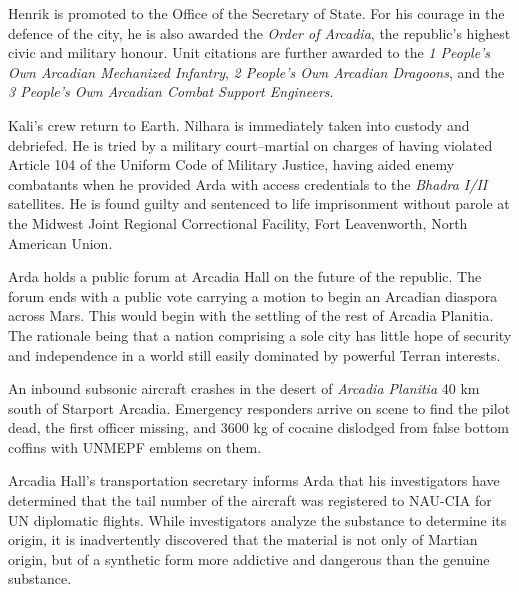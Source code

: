 Henrik is promoted to the Office of the Secretary of State. For his courage in the defence of the city, he is also awarded the {\it Order of Arcadia}, the republic's highest civic and military honour. Unit citations are further awarded to the {\it 1 People's Own Arcadian Mechanized Infantry}, {\it 2 People's Own Arcadian Dragoons}, and the {\it 3 People's Own Arcadian Combat Support Engineers}.
\StopTimelineDate

Kali's crew return to Earth. Nilhara is immediately taken into custody and debriefed. He is tried by a military court--martial on charges of having violated Article 104 of the Uniform Code of Military Justice, having aided enemy combatants when he provided Arda with access credentials to the {\it Bhadra I/II} satellites. He is found guilty and sentenced to life imprisonment without parole at the Midwest Joint Regional Correctional Facility, Fort Leavenworth, North American Union.
\StopTimelineDate

Arda holds a public forum at Arcadia Hall on the future of the republic. The forum ends with a public vote carrying a motion to begin an Arcadian diaspora across Mars. This would begin with the settling of the rest of Arcadia Planitia. The rationale being that a nation comprising a sole city has little hope of security and independence in a world still easily dominated by powerful Terran interests.
\StopTimelineDate

An inbound subsonic aircraft crashes in the desert of {\it Arcadia Planitia} 40 km south of Starport Arcadia. Emergency responders arrive on scene to find the pilot dead, the first officer missing, and 3600 kg of cocaine dislodged from false bottom coffins with UNMEPF emblems on them. 

Arcadia Hall's transportation secretary informs Arda that his investigators have determined that the tail number of the aircraft was registered to NAU-CIA for UN diplomatic flights. While investigators analyze the substance to determine its origin, it is inadvertently discovered that the material is not only of Martian origin, but of a synthetic form more addictive and dangerous than the genuine substance.
\StopTimelineDate

